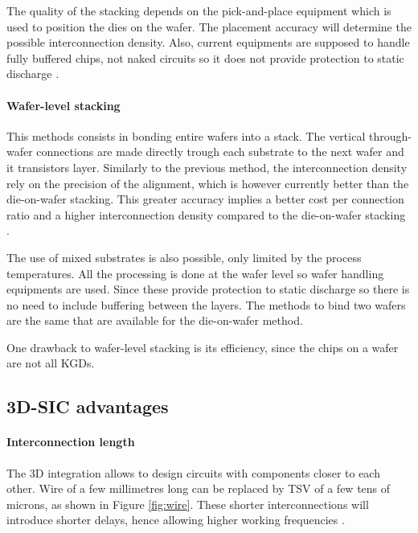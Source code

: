 The quality of the stacking depends on the pick-and-place equipment which is used to position the dies on the wafer. The placement accuracy will determine the possible interconnection density. Also, current equipments are supposed to handle fully buffered chips, not naked circuits so it does not provide protection to static discharge \cite{659500}. 

\paragraph{Wafer-level stacking}

This methods consists in bonding entire wafers into a stack. The vertical through-wafer connections are made directly trough each substrate to the next wafer and it transistors layer. Similarly to the previous method, the interconnection density rely on the precision of the alignment, which is however currently better than the die-on-wafer stacking. This greater accuracy implies a better cost per connection ratio and a higher interconnection density compared to the die-on-wafer stacking \cite{659500}.

The use of mixed substrates is also possible, only limited by the process temperatures. All the processing is done at the wafer level so wafer handling equipments are used. Since these provide protection to static discharge so there is no need to include buffering between the layers. The methods to bind two wafers are the same that are available for the die-on-wafer method.

One drawback to wafer-level stacking is its efficiency, since the chips on a wafer are not all KGDs.

\subsection{3D-SIC advantages}

\paragraph{Interconnection length}

The 3D integration allows to design circuits with components closer to each other. Wire of a few millimetres long can be replaced by TSV of a few tens of microns, as shown in Figure \ref{fig:wire}. These shorter interconnections will introduce shorter delays, hence allowing higher working frequencies \cite{659500,981091}.

